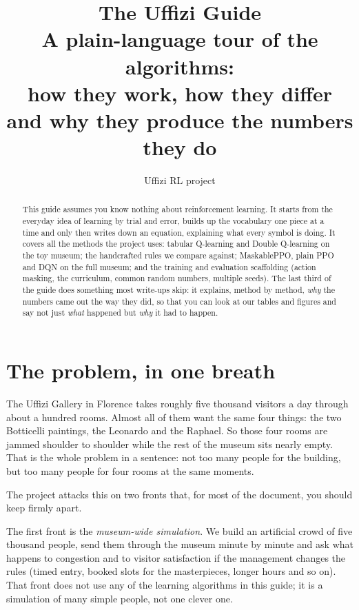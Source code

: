 \documentclass[11pt]{article}
\title{\textbf{The Uffizi Guide}\\[0.3em]
\large A plain-language tour of the algorithms:\\
how they work, how they differ and why they produce the numbers they do}
\author{Uffizi RL project}
\date{}
\newcommand{\key}[1]{\textit{#1}}            %
\begin{document}
\maketitle
\thispagestyle{empty}

\begin{abstract}
\noindent This guide assumes you know nothing about reinforcement learning. It starts
from the everyday idea of learning by trial and error, builds up the vocabulary one
piece at a time and only then writes down an equation, explaining what every symbol is
doing. It covers all the methods the project uses: tabular Q-learning and Double
Q-learning on the toy museum; the handcrafted rules we compare against; MaskablePPO,
plain PPO and DQN on the full museum; and the training and evaluation scaffolding
(action masking, the curriculum, common random numbers, multiple seeds). The last third
of the guide does something most write-ups skip: it explains, method by method, \key{why}
the numbers came out the way they did, so that you can look at our tables and figures and
say not just \emph{what} happened but \emph{why} it had to happen.
\end{abstract}

\tableofcontents
\newpage

\section{The problem, in one breath}

The Uffizi Gallery in Florence takes roughly five thousand visitors a day through about
a hundred rooms. Almost all of them want the same four things: the two Botticelli
paintings, the Leonardo and the Raphael. So those four rooms are jammed shoulder to
shoulder while the rest of the museum sits nearly empty. That is the whole problem in a
sentence: not too many people for the building, but too many people for four rooms at
the same moments.

The project attacks this on two fronts that, for most of the document, you should keep
firmly apart.

The first front is the \key{museum-wide simulation}. We build an artificial crowd of
five thousand people, send them through the museum minute by minute and ask what
happens to congestion and to visitor satisfaction if the management changes the rules
(timed entry, booked slots for the masterpieces, longer hours and so on). That front
does not use any of the learning algorithms in this guide; it is a simulation of many
simple people, not one clever one.
\end{document}

